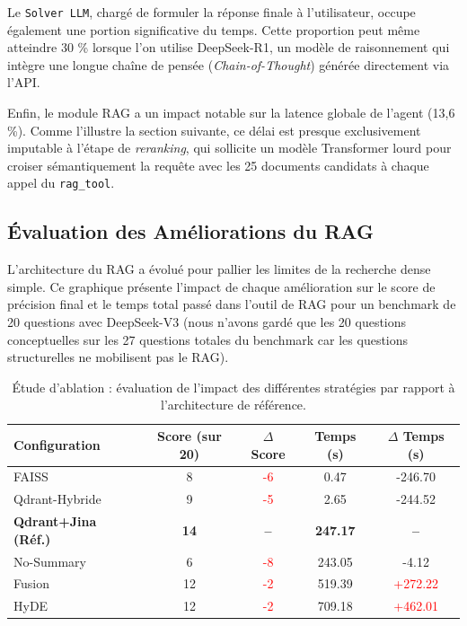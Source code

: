 Le \texttt{Solver LLM}, chargé de formuler la réponse finale à l'utilisateur, occupe également une portion significative du temps. Cette proportion peut même atteindre 30 \% lorsque l'on utilise DeepSeek-R1, un modèle de raisonnement qui intègre une longue chaîne de pensée (\textit{Chain-of-Thought}) générée directement via l'API.

Enfin, le module RAG a un impact notable sur la latence globale de l'agent (13,6 \%). Comme l'illustre la section suivante, ce délai est presque exclusivement imputable à l'étape de \textit{reranking}, qui sollicite un modèle Transformer lourd pour croiser sémantiquement la requête avec les 25 documents candidats à chaque appel du \texttt{rag\_tool}.

\subsection{Évaluation des Améliorations du RAG}

L'architecture du RAG a évolué pour pallier les limites de la recherche dense simple. Ce graphique présente l'impact de chaque amélioration sur le score de précision final et le temps total passé dans l'outil de RAG pour un benchmark de 20 questions avec DeepSeek-V3 (nous n'avons gardé que les 20 questions conceptuelles sur les 27 questions totales du benchmark car les questions structurelles ne mobilisent pas le RAG).

\begin{table}[H]
    \centering
    \renewcommand{\arraystretch}{1.4} %
    \begin{tabular}{l cc cc}
        \toprule
        \textbf{Configuration} & \textbf{Score (sur 20)} & \textbf{$\Delta$ Score} & \textbf{Temps (s)} & \textbf{$\Delta$ Temps (s)} \\
        \midrule
        FAISS & 8 & \textcolor{red}{-6} & 0.47 & \textcolor{green!70!black}{-246.70} \\
        Qdrant-Hybride & 9 & \textcolor{red}{-5} & 2.65 & \textcolor{green!70!black}{-244.52} \\
        \rowcolor{gray!15} 
        \textbf{Qdrant+Jina (Réf.)} & \textbf{14} & \textbf{--} & \textbf{247.17} & \textbf{--} \\
        No-Summary & 6 & \textcolor{red}{-8} & 243.05 & \textcolor{green!70!black}{-4.12} \\
        Fusion & 12 & \textcolor{red}{-2} & 519.39 & \textcolor{red}{+272.22} \\
        HyDE & 12 & \textcolor{red}{-2} & 709.18 & \textcolor{red}{+462.01} \\
        \bottomrule
    \end{tabular}
    \caption{Étude d'ablation : évaluation de l'impact des différentes stratégies par rapport à l'architecture de référence.}
    \label{tab:ablation_rag}
\end{table}

